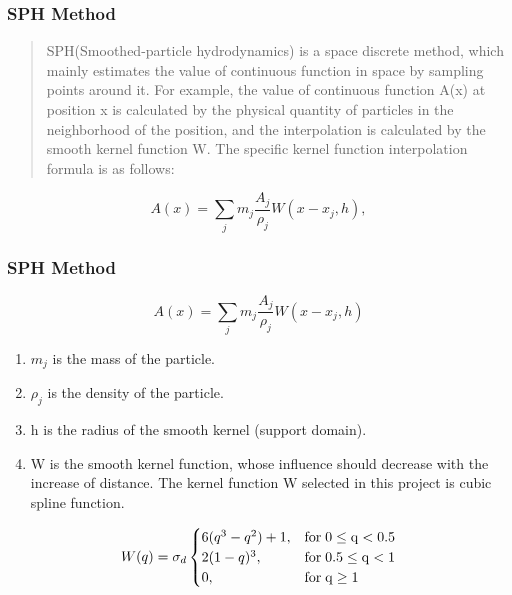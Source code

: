 \begin{frame}
    \frametitle{SPH Method}
    \begin{quote}
    SPH(Smoothed-particle hydrodynamics) is a space discrete method, which mainly estimates the value of continuous function in space by sampling points around it. For example, the value of continuous function A(x) at position x is calculated by the physical quantity of particles in the neighborhood of the position, and the interpolation is calculated by the smooth kernel function W. The specific kernel function interpolation formula is as follows:
    \end{quote}
    \begin{equation}
        A(x)=\sum_{j}m_j\frac{A_j}{\rho_j}W(x-x_j,h),
    \end{equation}

\end{frame}

\begin{frame}
    \frametitle{SPH Method}
    \begin{equation}
        A(x)=\sum_{j}m_j\frac{A_j}{\rho_j}W(x-x_j,h) \nonumber
    \end{equation}
    \begin{enumerate}
        \item $m_j$ is the mass of the particle.
        \item $\rho_j$ is the density of the particle.
        \item h is the radius of the smooth kernel (support domain).
        \item W is the smooth kernel function, whose influence should decrease with the increase of distance. The kernel function W selected in this project is cubic spline function.
    \end{enumerate}
    \begin{equation}
        W(q)=\sigma_d \begin{cases}
            6(q^3-q^2)+1, & \rm{for\; 0\leq q< 0.5} \\
            2(1-q)^3,     & \rm{for\; 0.5\leq q< 1} \\
            0,            & \rm{for\; q\ge 1}       \\
        \end{cases}
    \end{equation}
\end{frame}


